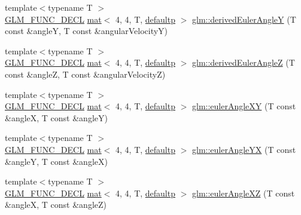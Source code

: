 \begin{DoxyCompactItemize}
\item 
{\footnotesize template$<$typename T $>$ }\\\mbox{\hyperlink{setup_8hpp_ab2d052de21a70539923e9bcbf6e83a51}{G\+L\+M\+\_\+\+F\+U\+N\+C\+\_\+\+D\+E\+CL}} \mbox{\hyperlink{structglm_1_1mat}{mat}}$<$ 4, 4, T, \mbox{\hyperlink{namespaceglm_a36ed105b07c7746804d7fdc7cc90ff25a9d21ccd8b5a009ec7eb7677befc3bf51}{defaultp}} $>$ \mbox{\hyperlink{group__gtx__euler__angles_ga0a4c56ecce7abcb69508ebe6313e9d10}{glm\+::derived\+Euler\+AngleY}} (T const \&angleY, T const \&angular\+VelocityY)
\item 
{\footnotesize template$<$typename T $>$ }\\\mbox{\hyperlink{setup_8hpp_ab2d052de21a70539923e9bcbf6e83a51}{G\+L\+M\+\_\+\+F\+U\+N\+C\+\_\+\+D\+E\+CL}} \mbox{\hyperlink{structglm_1_1mat}{mat}}$<$ 4, 4, T, \mbox{\hyperlink{namespaceglm_a36ed105b07c7746804d7fdc7cc90ff25a9d21ccd8b5a009ec7eb7677befc3bf51}{defaultp}} $>$ \mbox{\hyperlink{group__gtx__euler__angles_gae8b397348201c42667be983ba3f344df}{glm\+::derived\+Euler\+AngleZ}} (T const \&angleZ, T const \&angular\+VelocityZ)
\item 
{\footnotesize template$<$typename T $>$ }\\\mbox{\hyperlink{setup_8hpp_ab2d052de21a70539923e9bcbf6e83a51}{G\+L\+M\+\_\+\+F\+U\+N\+C\+\_\+\+D\+E\+CL}} \mbox{\hyperlink{structglm_1_1mat}{mat}}$<$ 4, 4, T, \mbox{\hyperlink{namespaceglm_a36ed105b07c7746804d7fdc7cc90ff25a9d21ccd8b5a009ec7eb7677befc3bf51}{defaultp}} $>$ \mbox{\hyperlink{group__gtx__euler__angles_ga64036577ee17a2d24be0dbc05881d4e2}{glm\+::euler\+Angle\+XY}} (T const \&angleX, T const \&angleY)
\item 
{\footnotesize template$<$typename T $>$ }\\\mbox{\hyperlink{setup_8hpp_ab2d052de21a70539923e9bcbf6e83a51}{G\+L\+M\+\_\+\+F\+U\+N\+C\+\_\+\+D\+E\+CL}} \mbox{\hyperlink{structglm_1_1mat}{mat}}$<$ 4, 4, T, \mbox{\hyperlink{namespaceglm_a36ed105b07c7746804d7fdc7cc90ff25a9d21ccd8b5a009ec7eb7677befc3bf51}{defaultp}} $>$ \mbox{\hyperlink{group__gtx__euler__angles_ga4f57e6dd25c3cffbbd4daa6ef3f4486d}{glm\+::euler\+Angle\+YX}} (T const \&angleY, T const \&angleX)
\item 
{\footnotesize template$<$typename T $>$ }\\\mbox{\hyperlink{setup_8hpp_ab2d052de21a70539923e9bcbf6e83a51}{G\+L\+M\+\_\+\+F\+U\+N\+C\+\_\+\+D\+E\+CL}} \mbox{\hyperlink{structglm_1_1mat}{mat}}$<$ 4, 4, T, \mbox{\hyperlink{namespaceglm_a36ed105b07c7746804d7fdc7cc90ff25a9d21ccd8b5a009ec7eb7677befc3bf51}{defaultp}} $>$ \mbox{\hyperlink{group__gtx__euler__angles_gaa39bd323c65c2fc0a1508be33a237ce9}{glm\+::euler\+Angle\+XZ}} (T const \&angleX, T const \&angleZ)

\end{DoxyCompactItemize}
